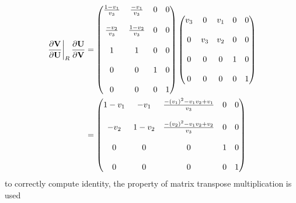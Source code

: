 \begin{equation}
  \begin{aligned}
    \left. \frac{\partial \mathbf V}{\partial \mathbf U}\right|_{R} \frac{\partial \mathbf U}{\partial \mathbf V} &= 
    \begin{pmatrix}
      \frac{1-v_1}{v_3} & \frac{-v_1}{v_3}  & 0 & 0 \\ \\
      \frac{-v_2}{v_3}  & \frac{1-v_2}{v_3} & 0 & 0 \\ \\
      1                 & 1                 & 0 & 0 \\ \\
      0                 & 0                 & 1 & 0 \\ \\
      0                 & 0                 & 0 & 1
    \end{pmatrix}
    \begin{pmatrix}
      v_3 & 0   & v_1 & 0 & 0 \\ \\
      0   & v_3 & v_2 & 0 & 0 \\ \\
      0   & 0   & 0   & 1 & 0 \\ \\
      0   & 0   & 0   & 0 & 1
    \end{pmatrix} \\
    &= 
    \begin{pmatrix}
      1-v_1 & -v_1  & \frac{-(v_1)^2 - v_1 v_2 + v_1}{v_3} & 0 & 0 \\ \\
      -v_2  & 1-v_2 & \frac{-(v_2)^2 - v_1 v_2 + v_2}{v_3} & 0 & 0 \\ \\
      0     & 0     & 0                                    & 1 & 0 \\ \\
      0     & 0     & 0                                    & 0 & 1
    \end{pmatrix}
  \end{aligned}
  \label{dvdu-jac-right-I-bad}
\end{equation}
to correctly compute identity, the property of matrix transpose multiplication
is used
